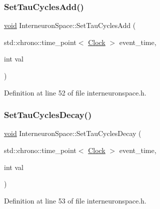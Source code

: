 \subsubsection{\texorpdfstring{Set\+Tau\+Cycles\+Add()}{SetTauCyclesAdd()}}
{\footnotesize\ttfamily \mbox{\hyperlink{glad_8h_a950fc91edb4504f62f1c577bf4727c29}{void}} Interneuron\+Space\+::\+Set\+Tau\+Cycles\+Add (\begin{DoxyParamCaption}\item[{std\+::chrono\+::time\+\_\+point$<$ \mbox{\hyperlink{universe_8h_a0ef8d951d1ca5ab3cfaf7ab4c7a6fd80}{Clock}} $>$}]{event\+\_\+time,  }\item[{int}]{val }\end{DoxyParamCaption})\hspace{0.3cm}{\ttfamily [inline]}}



Definition at line 52 of file interneuronspace.\+h.

\mbox{\label{class_interneuron_space_a7f44a965e377ecdc5c387af2b5d30d69}} 
\subsubsection{\texorpdfstring{Set\+Tau\+Cycles\+Decay()}{SetTauCyclesDecay()}}
{\footnotesize\ttfamily \mbox{\hyperlink{glad_8h_a950fc91edb4504f62f1c577bf4727c29}{void}} Interneuron\+Space\+::\+Set\+Tau\+Cycles\+Decay (\begin{DoxyParamCaption}\item[{std\+::chrono\+::time\+\_\+point$<$ \mbox{\hyperlink{universe_8h_a0ef8d951d1ca5ab3cfaf7ab4c7a6fd80}{Clock}} $>$}]{event\+\_\+time,  }\item[{int}]{val }\end{DoxyParamCaption})\hspace{0.3cm}{\ttfamily [inline]}}



Definition at line 53 of file interneuronspace.\+h.

\mbox{\label{class_interneuron_space_a72ce2431e1348dd2558fa9b8f864d306}} 
